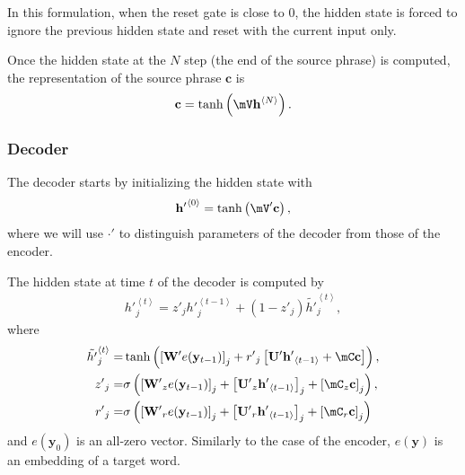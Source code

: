 \documentclass[a4paper]{article}
\newcommand{\qt}[1]{\left<#1\right>}
\newcommand{\vect}[1]{\mathbf{#1}}
\newcommand{\matr}[1]{\mathbf{#1}}
\newcommand{\vc}[0]{\vect{c}}
\newcommand{\vh}[0]{\vect{h}}
\newcommand{\vy}[0]{\vect{y}}
\newcommand{\mW}[0]{\matr{W}}
\newcommand{\mU}[0]{\matr{U}}
\begin{document}
In this formulation, when the reset gate is close to 0, the hidden state is
forced to ignore the previous hidden state and reset with the current input
only.

Once the hidden state at the $N$ step (the end of the source phrase) is computed, the representation of the source phrase
$\vc$ is
\begin{align*}
    \vc = \tanh \left( \mV \vh^{\qt{N}} \right).
\end{align*}

\subsubsection*{Decoder}

The decoder starts by initializing the hidden state with
\begin{align*}
    {\vh'}^{\qt{0}} = \tanh \left( \mV' \vc \right),
\end{align*}
where we will use $\cdot'$ to distinguish parameters of the
decoder from those of the encoder.

The hidden state at time $t$ of the decoder is computed by
\begin{align*}
    {h'}_j^{\qt{t}} = {z'}_j {h'}_j^{\qt{t-1}} +
    (1 - {z'}_j) \tilde{h'}_j^{\qt{t}},
\end{align*}
where
\begin{align*}
    \tilde{h'}_j^{\qt{t}} =& \tanh\left( 
    \left[ \mW' e(\vy_{t-1}) \right]_j + 
    {r'}_j \left[ \mU' {\vh'}_{\qt{t-1}} +
    \mC \vc 
    \right]
    \right),
    \\
    {z'}_j =& \sigma\left( \left[ {\mW'}_z e(\vy_{t-1}) \right]_j + 
    \left[{\mU'}_z {\vh'}_{\qt{t-1}}\right]_j +
    \left[\mC_z \vc \right]_j 
    \right),
    \\
    {r'}_j =& \sigma\left( \left[ {\mW'}_r e(\vy_{t-1}) \right]_j + 
    \left[{\mU'}_r {\vh'}_{\qt{t-1}}\right]_j +
    \left[ \mC_r \vc \right]_j
    \right)
\end{align*}
and $e(\vy_{0})$ is an all-zero vector. Similarly to the case of
the encoder, $e(\vy)$ is an embedding of a target word.
\end{document}
